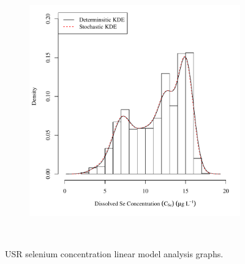 \begin{landscape}
\begin{figure}
\begin{subfigure}{0.7\textwidth}
			\includegraphics[width=\tableCustomSize]{"Figures/Results_USR/Stochastic/c d&s est CON"}
		\end{subfigure}\\
		\caption{USR selenium concentration linear model analysis graphs.}
	\end{figure}
\end{landscape}


